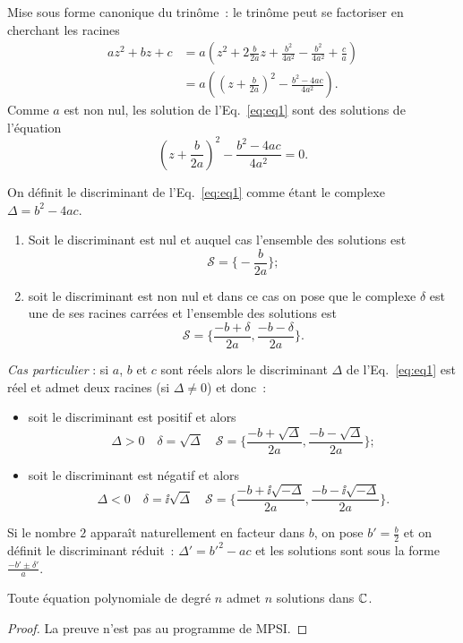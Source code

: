Mise sous forme canonique du trinôme~: le trinôme peut se factoriser en cherchant les racines
\begin{align}
  az^2+bz+c &= a \left(z^2+ 2 \frac{b}{2a}z + \frac{b^2}{4a^2} - \frac{b^2}{4a^2} +\frac{c}{a} \right)\\
  &=a \left( \left(z+\frac{b}{2a} \right)^2 - \frac{b^2-4ac}{4a^2} \right).
\end{align}
Comme $a$ est non nul, les solution de l'Eq.~\eqref{eq:eq1} sont des solutions de l'équation 
\begin{equation}
  \left(z+\frac{b}{2a} \right)^2 - \frac{b^2-4ac}{4a^2} =0.
\end{equation}
%
\begin{defdef}
  On définit le discriminant de l'Eq.~\eqref{eq:eq1} comme étant le complexe $\Delta=b^2-4ac$.
\end{defdef}
%
\begin{enumerate}
\item Soit le discriminant est nul et auquel cas l'ensemble des solutions est
  \begin{equation}
    \mathcal{S}=\biggl\lbrace-\frac{b}{2a} \biggl\rbrace;
  \end{equation}
\item soit le discriminant est non nul et dans ce cas on pose que le complexe $\delta$ est une de ses racines carrées et l'ensemble des solutions est 
\begin{equation}
  \mathcal{S}=\biggl\lbrace \frac{-b+\delta}{2a} , \frac{-b-\delta}{2a} \biggl\rbrace.
\end{equation} 
\end{enumerate}

\emph{Cas particulier} : si $a$, $b$ et $c$ sont réels alors le discriminant $\Delta$ de l'Eq.~\eqref{eq:eq1} est réel et admet deux racines (si $\Delta \neq 0$) et donc~:
\begin{itemize}
\item soit le discriminant est positif et alors
  \begin{equation}
    \Delta >0 \quad \delta=\sqrt{\Delta} \quad \mathcal{S} = \biggl\lbrace \frac{-b+\sqrt{\Delta}}{2a} , \frac{-b-\sqrt{\Delta}}{2a} \biggl\rbrace;
  \end{equation}
\item soit le discriminant est négatif et alors
  \begin{equation}
    \Delta <0 \quad \delta=\ii\sqrt{\Delta} \quad \mathcal{S} = \biggl\lbrace \frac{-b+\ii\sqrt{-\Delta}}{2a} , \frac{-b-\ii\sqrt{-\Delta}}{2a} \biggl\rbrace.
  \end{equation}
\end{itemize}
Si le nombre $2$ apparaît naturellement en facteur dans $b$, on pose $b'=\frac{b}{2}$ et on définit le discriminant réduit~: $\Delta'=b'^2-ac$ et les solutions sont sous la forme $\frac{-b'\pm \delta'}{a}$.
%
\begin{theo}
  Toute équation polynomiale de degré $n$ admet $n$ solutions dans $\mathbb{C}$.
\end{theo}
\begin{proof}
  La preuve n'est pas au programme de MPSI.
\end{proof}
%
